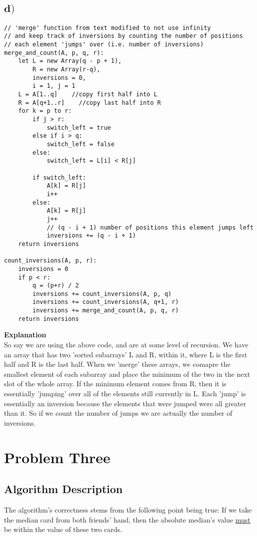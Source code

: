 \documentclass[a4paper,12pt]{article}
\begin{document}
\subsection*{\(\mathbf d)\)}
\begin{lstlisting}
// 'merge' function from text modified to not use infinity
// and keep track of inversions by counting the number of positions
// each element 'jumps' over (i.e. number of inversions)
merge_and_count(A, p, q, r):
    let L = new Array(q - p + 1),
        R = new Array(r-q),
        inversions = 0,
        i = 1, j = 1
    L = A[1..q]    //copy first half into L
    R = A[q+1..r]    //copy last half into R
    for k = p to r:
        if j > r:
            switch_left = true
        else if i > q:
            switch_left = false
        else:
            switch_left = L[i] < R[j]

        if switch_left:
            A[k] = R[j]
            i++
        else:
            A[k] = R[j]
            j++
            // (q - i + 1) number of positions this element jumps left 
            inversions += (q - i + 1)
    return inversions

count_inversions(A, p, r):
    inversions = 0
    if p < r:
        q = (p+r) / 2
        inversions += count_inversions(A, p, q)
        inversions += count_inversions(A, q+1, r)
        inversions += merge_and_count(A, p, q, r)
    return inversions
\end{lstlisting}
{\bf Explanation}\\
So say we are using the above code, and are at some level of recursion. We have an array that has
two 'sorted subarrays' L and R, within it, where L is the first half and R is the last half. When
we 'merge' these arrays, we comapre the smallest element of each subarray and place the minimum of the
two in the next slot of the whole array. If the minimum element comes from R, then it is essentially
'jumping' over all of the elements still currently in L. Each 'jump' is essentially an inversion
because the elements that were jumped were all greater than it. So if we count the number of jumps
we are actually the number of inversions.
\section{Problem Three}
\subsection*{Algorithm Description}
The algorithm's correctness stems from the following point being true: If we take the median card from both friends'
hand, then the absolute median's value \underline{must} be within the value of these two cards.\\
\end{document}
